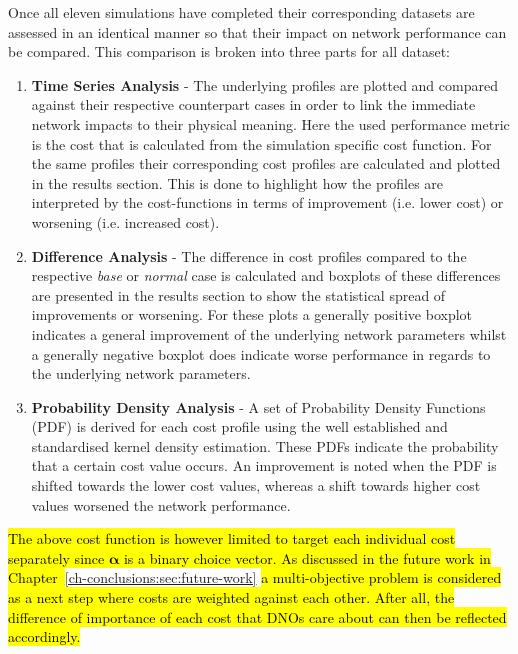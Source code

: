 Once all eleven simulations have completed their corresponding datasets are assessed in an identical manner so that their impact on network performance can be compared.
This comparison is broken into three parts for all dataset:

\begin{enumerate}
	\item \textbf{Time Series Analysis} - 
	The underlying profiles are plotted and compared against their respective counterpart cases in order to link the immediate network impacts to their physical meaning.
	Here the used performance metric is the cost that is calculated from the simulation specific cost function.
	For the same profiles their corresponding cost profiles are calculated and plotted in the results section.
	This is done to highlight how the profiles are interpreted by the cost-functions in terms of improvement (i.e. lower cost) or worsening (i.e. increased cost).
	\item \textbf{Difference Analysis} - 
	The difference in cost profiles compared to the respective \textit{base} or \textit{normal} case is calculated and boxplots of these differences are presented in the results section to show the statistical spread of improvements or worsening.
	For these plots a generally positive boxplot indicates a general improvement of the underlying network parameters whilst a generally negative boxplot does indicate worse performance in regards to the underlying network parameters.
	\item \textbf{Probability Density Analysis} - 
	A set of Probability Density Functions (PDF) is derived for each cost profile using the well established and standardised kernel density estimation.
	These PDFs indicate the probability that a certain cost value occurs.
	An improvement is noted when the PDF is shifted towards the lower cost values, whereas a shift towards higher cost values worsened the network performance.
\end{enumerate}

\hl{The above cost function is however limited to target each individual cost separately since $\boldsymbol{\alpha}$ is a binary choice vector.
As discussed in the future work in Chapter~}\ref{ch-conclusions:sec:future-work}\hl{ a multi-objective problem is considered as a next step where costs are weighted against each other.
After all, the difference of importance of each cost that DNOs care about can then be reflected accordingly.}
